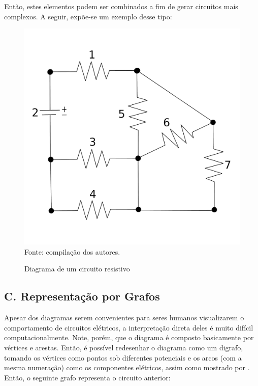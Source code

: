 \documentclass[twocolumn, 10pt]{extarticle}
\begin{document}
Então, estes elementos podem ser combinados a fim de gerar circuitos mais complexos. A seguir, expõe-se um exemplo desse tipo:

\begin{figure}[H]
	\caption{Diagrama de um circuito resistivo} 
	\centering
	\includegraphics[scale=0.35]{circ1}
	\\ Fonte: compilação dos autores.
\end{figure}


\subsection*{C. \quad Representação por Grafos}

Apesar dos diagramas serem convenientes para seres humanos visualizarem o comportamento de circuitos elétricos, a interpretação direta deles é muito difícil computacionalmente. Note, porém, que o diagrama é composto basicamente por vértices e arestas. Então, é possível redesenhar o diagrama como um digrafo, tomando os vértices como pontos sob diferentes potenciais e os arcos (com a mesma numeração) como os componentes elétricos, assim como mostrado por \cite[p. 838]{krishna}. Então, o seguinte grafo representa o circuito anterior:
\end{document}
